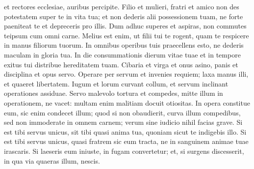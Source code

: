 \begin{biblechapter}
\begin{biblechapter}
\begin{biblechapter}
\begin{biblechapter}
\begin{biblechapter}
\begin{biblechapter}
\begin{biblechapter}
\begin{biblechapter}
\begin{biblechapter}
\begin{biblechapter}
\begin{biblechapter}
\begin{biblechapter}
\begin{biblechapter}
\begin{biblechapter}
\begin{biblechapter}
\begin{biblechapter}
\begin{biblechapter}
\begin{biblechapter}
\begin{biblechapter}
\begin{biblechapter}
\begin{biblechapter}
\begin{biblechapter}
\begin{biblechapter}
\begin{biblechapter}
\begin{biblechapter}
\begin{biblechapter}
\begin{biblechapter}
\begin{biblechapter}
\begin{biblechapter}
\begin{biblechapter}
\begin{biblechapter}
\begin{biblechapter}
\begin{biblechapter}
 et rectores ecclesiae, auribus percipite.
 \verse Filio et mulieri, fratri et amico
 non des potestatem super te in vita tua;
 et non dederis alii possessionem tuam,
 ne forte paeniteat te et depreceris pro illis.
 \verse Dum adhuc superes et aspiras,
 non commutes teipsum cum omni carne.
 \verse Melius est enim, ut filii tui te rogent,
 quam te respicere in manus filiorum tuorum.
 \verse In omnibus operibus tuis praecellens esto,
 \verse ne dederis maculam in gloria tua.
 In die consummationis dierum vitae tuae
 et in tempore exitus tui distribue hereditatem tuam.
 \verse Cibaria et virga et onus asino,
 panis et disciplina et opus servo.
 \verse Operare per servum et invenies requiem;
 laxa manus illi, et quaeret libertatem.
 \verse Iugum et lorum curvant collum,
 et servum inclinant operationes assiduae.
 \verse Servo malevolo tortura et compedes,
 mitte illum in operationem, ne vacet:
 \verse multam enim malitiam docuit otiositas.
 \verse In opera constitue eum, sic enim condecet illum;
 quod si non obaudierit, curva illum compedibus,
 sed non immoderate in omnem carnem;
 verum sine iudicio nihil facias grave.
 \verse Si est tibi servus unicus, sit tibi quasi anima tua,
 quoniam sicut te indigebis illo.
 Si est tibi servus unicus, quasi fratrem sic eum tracta,
 ne in sanguinem animae tuae irascaris.
 \verse Si laeseris eum iniuste, in fugam convertetur;
 \verse et, si surgens discesserit,
 in qua via quaeras illum, nescis.
 

\end{biblechapter}
\end{biblechapter}
\end{biblechapter}
\end{biblechapter}
\end{biblechapter}
\end{biblechapter}
\end{biblechapter}
\end{biblechapter}
\end{biblechapter}
\end{biblechapter}
\end{biblechapter}
\end{biblechapter}
\end{biblechapter}
\end{biblechapter}
\end{biblechapter}
\end{biblechapter}
\end{biblechapter}
\end{biblechapter}
\end{biblechapter}
\end{biblechapter}
\end{biblechapter}
\end{biblechapter}
\end{biblechapter}
\end{biblechapter}
\end{biblechapter}
\end{biblechapter}
\end{biblechapter}
\end{biblechapter}
\end{biblechapter}
\end{biblechapter}
\end{biblechapter}
\end{biblechapter}
\end{biblechapter}
